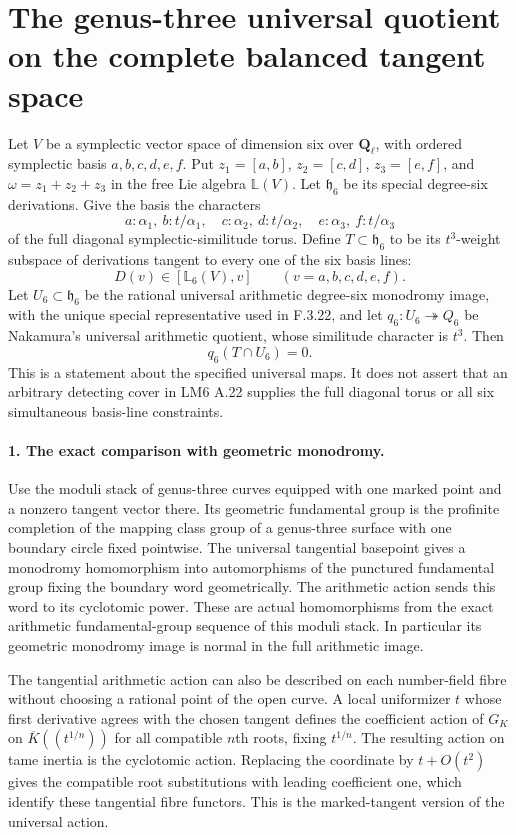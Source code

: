 \section*{The genus-three universal quotient on the complete balanced tangent space}

Let $V$ be a symplectic vector space of dimension six over
$\mathbf Q_\ell$, with ordered symplectic basis
$a,b,c,d,e,f$. Put $z_1=[a,b]$, $z_2=[c,d]$,
$z_3=[e,f]$, and $\omega=z_1+z_2+z_3$ in the free Lie
algebra $\mathbb L(V)$. Let $\mathfrak h_6$ be its special
degree-six derivations. Give the basis the characters
\[
 a:\alpha_1,\ b:t/\alpha_1,\quad
 c:\alpha_2,\ d:t/\alpha_2,\quad
 e:\alpha_3,\ f:t/\alpha_3
\]
of the full diagonal symplectic-similitude torus. Define
$T\subset\mathfrak h_6$ to be its $t^3$-weight subspace
of derivations tangent to every one of the six basis lines:
\[
 D(v)\in[\mathbb L_6(V),v]\qquad(v=a,b,c,d,e,f).
\]
Let $U_6\subset\mathfrak h_6$ be the rational universal
arithmetic degree-six monodromy image, with the unique
special representative used in F.3.22, and let
$q_6:U_6\twoheadrightarrow Q_6$ be Nakamura's universal
arithmetic quotient, whose similitude character is $t^3$.
Then
\[
                         q_6(T\cap U_6)=0.                 \tag{G3.1}
\]
This is a statement about the specified universal maps.
It does not assert that an arbitrary detecting cover in
LM6 A.22 supplies the full diagonal torus or all six
simultaneous basis-line constraints.

\paragraph{1. The exact comparison with geometric monodromy.}
Use the moduli stack of genus-three curves equipped with
one marked point and a nonzero tangent vector there.
Its geometric fundamental group is the profinite
completion of the mapping class group of a genus-three
surface with one boundary circle fixed pointwise.
The universal tangential basepoint gives a monodromy
homomorphism into automorphisms of the punctured
fundamental group fixing the boundary word geometrically.
The arithmetic action sends this word to its cyclotomic
power. These are actual homomorphisms from the exact
arithmetic fundamental-group sequence of this moduli stack.
In particular its geometric monodromy image is normal
in the full arithmetic image.

The tangential arithmetic action can also be described
on each number-field fibre without choosing a rational
point of the open curve. A local uniformizer $t$ whose
first derivative agrees with the chosen tangent defines
the coefficient action of $G_K$ on
$\overline K((t^{1/n}))$ for all compatible $n$th roots,
fixing $t^{1/n}$. The resulting action on tame inertia
is the cyclotomic action. Replacing the coordinate by
$t+O(t^2)$ gives the compatible root substitutions with
leading coefficient one, which identify these tangential
fibre functors. This is the marked-tangent version of
the universal action.

